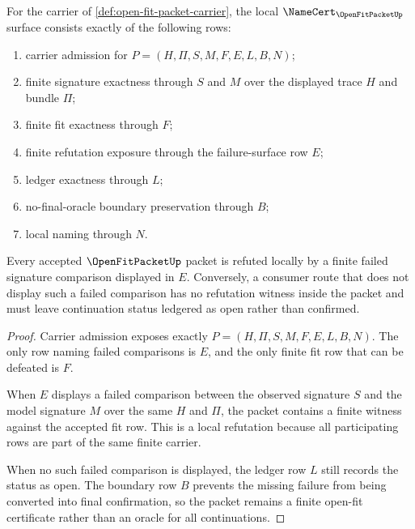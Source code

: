 \begin{definition}
\label{def:open-fit-obligation-surface}
For the carrier of \autoref{def:open-fit-packet-carrier}, the local $\NameCert_{\OpenFitPacketUp}$ surface consists exactly of the following rows:
\begin{enumerate}
\item carrier admission for $P=(H,\Pi,S,M,F,E,L,B,N)$;
\item finite signature exactness through $S$ and $M$ over the displayed trace $H$ and bundle $\Pi$;
\item finite fit exactness through $F$;
\item finite refutation exposure through the failure-surface row $E$;
\item ledger exactness through $L$;
\item no-final-oracle boundary preservation through $B$;
\item local naming through $N$.
\end{enumerate}
\end{definition}

\begin{theorem}
\label{thm:open-fit-finite-refutation-surface}
Every accepted $\OpenFitPacketUp$ packet is refuted locally by a finite failed signature comparison displayed in $E$. Conversely, a consumer route that does not display such a failed comparison has no refutation witness inside the packet and must leave continuation status ledgered as open rather than confirmed.
\end{theorem}
\begin{proof}
Carrier admission exposes exactly $P=(H,\Pi,S,M,F,E,L,B,N)$. The only row naming failed comparisons is $E$, and the only finite fit row that can be defeated is $F$.

When $E$ displays a failed comparison between the observed signature $S$ and the model signature $M$ over the same $H$ and $\Pi$, the packet contains a finite witness against the accepted fit row. This is a local refutation because all participating rows are part of the same finite carrier.

When no such failed comparison is displayed, the ledger row $L$ still records the status as open. The boundary row $B$ prevents the missing failure from being converted into final confirmation, so the packet remains a finite open-fit certificate rather than an oracle for all continuations.
\end{proof}

